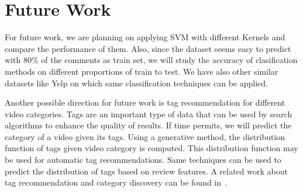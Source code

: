 \section{Future Work}
\label{future}
For future work, we are planning on applying SVM with different Kernels and compare the performance of them. Also, since the dataset seems easy to predict with $80\%$ of the comments as train set, we will study the accuracy of clasification methods on different proportions of train to test. We have also other similar datasets like Yelp on which same classification techniques can be applied. 

Another possible direction for future work is tag recommendation for different video categories. 
Tags are an important type of data that can be used by search algorithms to enhance the quality of results. 
If time permits, we will predict the category of a video given its tags. 
Using a generative method, the distribution function of tags given video category is computed. This distribution function may be used for automatic tag recommendations. Same techniques can be used to predict the distribution of tags based on review features.
A related work about tag recommendation and category discovery can be found in~\cite{tagRecCatDis}.